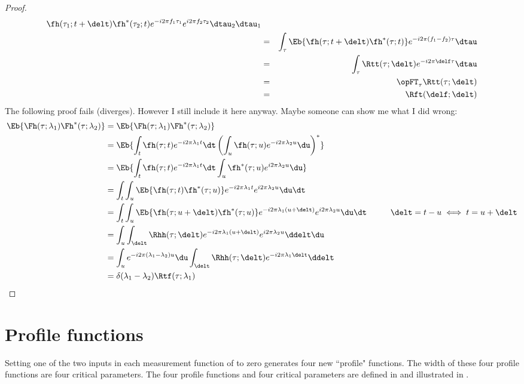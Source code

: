 \begin{proof}
\begin{eqnarray*}
{             \fh(\tau_1;t+\delt) \fh^\ast(\tau_2;t) }
              e^{-i2\pi f_1\tau_1}e^{i2\pi f_2\tau_2} 
            \dtau_2 \dtau_1
   \\&=& \int_{\tau}\Eb{
             \fh(\tau;t+\delt) \fh^\ast(\tau;t) }
              e^{-i2\pi (f_1-f_2)\tau}
            \dtau
   \\&=& \int_{\tau}\Rtt(\tau;\delt)
              e^{-i2\pi \delf \tau}
            \dtau
   \\&=& \opFT_\tau \Rtt(\tau;\delt)
   \\&=& \Rft(\delf;\delt)
\end{eqnarray*}
The following proof fails (diverges).
However I still include it here anyway.
Maybe someone can show me what I did wrong:
\begin{align*}
  \Eb{ \Fh(\tau;\lambda_1) \Fh^\ast(\tau;\lambda_2) }
    &= \Eb{ \Fh(\tau;\lambda_1) \Fh^\ast(\tau;\lambda_2) }
  \\&= \Eb{   \int_t \fh(\tau;t) e^{-i2\pi\lambda_1 t} \dt
       \left( \int_u \fh(\tau;u) e^{-i2\pi\lambda_2 u} \du \right)^\ast
       }
  \\&= \Eb{ \int_t \fh     (\tau;t) e^{-i2\pi\lambda_1 t} \dt
            \int_u \fh^\ast(\tau;u) e^{ i2\pi\lambda_2 u} \du 
       }
  \\&= \int_t \int_u  \Eb{ \fh(\tau;t) \fh^\ast(\tau;u) }
            e^{-i2\pi\lambda_1t} e^{ i2\pi\lambda_2u} \du \dt 
  \\&= \int_t \int_u  \Eb{ \fh(\tau;u+\delt) \fh^\ast(\tau;u) }
            e^{-i2\pi\lambda_1(u+\delt)} e^{ i2\pi\lambda_2u} \du \dt 
       \hspace{1cm}\delt=t-u \iff t=u+\delt
  \\&= \int_u \int_{\delt}  \Rhh(\tau;\delt)
            e^{-i2\pi\lambda_1(u+\delt)} e^{ i2\pi\lambda_2u} \ddelt \du 
  \\&= \int_u e^{-i2\pi(\lambda_1-\lambda_2)u} \du 
       \int_{\delt}  \Rhh(\tau;\delt) e^{-i2\pi\lambda_1\delt}  \ddelt 
  \\&= \delta(\lambda_1-\lambda_2)\Rtf(\tau;\lambda_1)
\end{align*}
\end{proof}
\section{Profile functions}
Setting one of the two inputs in each 
measurement function of  to zero
generates four new ``profile" functions.
The width of these four profile functions are four critical parameters.
The four profile functions and four critical parameters are
defined in  and 
illustrated in .


